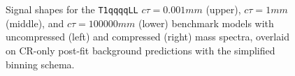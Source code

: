 \begin{figure}[!ht]
{        \label{fig:T1qqqqLL_ctau_1_uncompressed_MR_simp}
    } \\
     ~~
     \\
    \caption{ Signal shapes for the \texttt{T1qqqqLL}
      $c\tau=0.001\unit{mm}$ (upper), $c\tau=1\unit{mm}$ (middle), and
      $c\tau=100000\unit{mm}$ (lower) benchmark models with
      uncompressed (left) and compressed (right) mass spectra,
      overlaid on CR-only post-fit background predictions with the
      simplified binning schema. }
    \label{fig:T1qqqqLL_MR_simp}
\end{figure}

